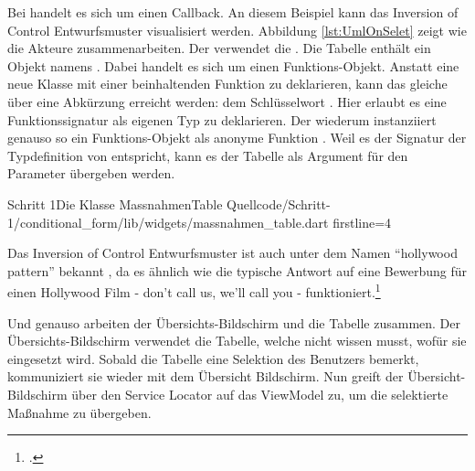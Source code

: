 Bei  handelt es sich um einen Callback.
An diesem Beispiel kann das Inversion of Control Entwurfsmuster visualisiert werden.
Abbildung \ref{lst:UmlOnSelet} zeigt wie die Akteure zusammenarbeiten.
Der  verwendet die .
Die Tabelle enthält ein Objekt namens .
Dabei handelt es sich um einen Funktions-Objekt.
Anstatt eine neue Klasse mit einer beinhaltenden Funktion zu deklarieren, kann das gleiche über eine Abkürzung erreicht werden: dem Schlüsselwort  .
Hier erlaubt es eine Funktionssignatur als eigenen Typ zu deklarieren.
Der  wiederum instanziiert genauso so ein Funktions-Objekt als anonyme Funktion .
Weil es der Signatur der Typdefinition von   entspricht, kann es der Tabelle als Argument für den Parameter  übergeben werden. 

\ifincludeall \clearpage \fi

\begin{alexlisting}{Schritt 1}{Die Klasse MassnahmenTable}
  {Quellcode/Schritt-1/conditional_form/lib/widgets/massnahmen_table.dart}
  {firstline=4}
  \label{lst:Schritt1KlasseMassnahmenTable}
\end{alexlisting}

\ifincludeall \clearpage \fi


Das Inversion of Control Entwurfsmuster ist auch unter dem Namen \enquote{hollywood pattern} bekannt , da es ähnlich wie die typische Antwort auf eine Bewerbung für einen Hollywood Film - don’t call us, we’ll call you - funktioniert.\footcite[Vgl.][]{fowler2005InversionOfControl}

Und genauso arbeiten der Übersichts-Bildschirm und die Tabelle zusammen.
Der Übersichts-Bildschirm verwendet die Tabelle, welche nicht wissen musst, wofür sie eingesetzt wird.
Sobald die Tabelle eine Selektion des Benutzers bemerkt, kommuniziert sie wieder mit dem Übersicht Bildschirm.
Nun greift der Übersicht-Bildschirm über den Service Locator auf das ViewModel zu, um die selektierte Maßnahme zu übergeben. 

